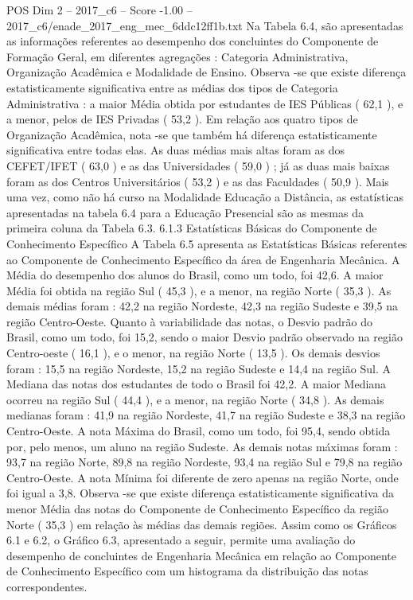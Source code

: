 \begin{textsample}{POS Dim 2 – 2017\_c6 – Score -1.00 – 2017\_c6/enade\_2017\_eng\_mec\_6ddc12ff1b.txt}
Na Tabela 6.4, são apresentadas as informações referentes ao desempenho dos concluintes do Componente de Formação Geral, em diferentes agregações : Categoria Administrativa, Organização Acadêmica e Modalidade de Ensino.
Observa -se que existe diferença estatisticamente significativa entre as médias dos tipos de Categoria Administrativa : a maior Média obtida por estudantes de IES Públicas ( 62,1 ), e a menor, pelos de IES Privadas ( 53,2 ).
Em relação aos quatro tipos de Organização Acadêmica, nota -se que também há diferença estatisticamente significativa entre todas elas.
As duas médias mais altas foram as dos CEFET/IFET ( 63,0 ) e as das Universidades ( 59,0 ) ; já as duas mais baixas foram as dos Centros Universitários ( 53,2 ) e as das Faculdades ( 50,9 ).
Mais uma vez, como não há curso na Modalidade Educação a Distância, as estatísticas apresentadas na tabela 6.4 para a Educação Presencial são as mesmas da primeira coluna da Tabela 6.3. 6.1.3 Estatísticas Básicas do Componente de Conhecimento Específico A Tabela 6.5 apresenta as Estatísticas Básicas referentes ao Componente de Conhecimento Específico da área de Engenharia Mecânica.
A Média do desempenho dos alunos do Brasil, como um todo, foi 42,6.
A maior Média foi obtida na região Sul ( 45,3 ), e a menor, na região Norte ( 35,3 ).
As demais médias foram : 42,2 na região Nordeste, 42,3 na região Sudeste e 39,5 na região Centro-Oeste.
Quanto à variabilidade das notas, o Desvio padrão do Brasil, como um todo, foi 15,2, sendo o maior Desvio padrão observado na região Centro-oeste ( 16,1 ), e o menor, na região Norte ( 13,5 ).
Os demais desvios foram : 15,5 na região Nordeste, 15,2 na região Sudeste e 14,4 na região Sul.
A Mediana das notas dos estudantes de todo o Brasil foi 42,2.
A maior Mediana ocorreu na região Sul ( 44,4 ), e a menor, na região Norte ( 34,8 ).
As demais medianas foram : 41,9 na região Nordeste, 41,7 na região Sudeste e 38,3 na região Centro-Oeste.
A nota Máxima do Brasil, como um todo, foi 95,4, sendo obtida por, pelo menos, um aluno na região Sudeste.
As demais notas máximas foram : 93,7 na região Norte, 89,8 na região Nordeste, 93,4 na região Sul e 79,8 na região Centro-Oeste.
A nota Mínima foi diferente de zero apenas na região Norte, onde foi igual a 3,8.
Observa -se que existe diferença estatisticamente significativa da menor Média das notas do Componente de Conhecimento Específico da região Norte ( 35,3 ) em relação às médias das demais regiões.
Assim como os Gráficos 6.1 e 6.2, o Gráfico 6.3, apresentado a seguir, permite uma avaliação do desempenho de concluintes de Engenharia Mecânica em relação ao Componente de Conhecimento Específico com um histograma da distribuição das notas correspondentes.

\end{textsample}
